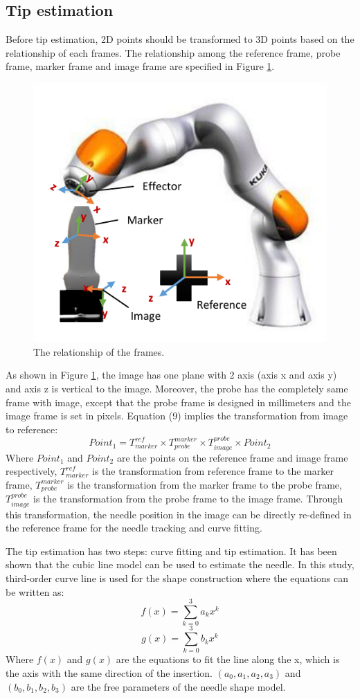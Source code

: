 \documentclass[journal,article,submit,moreauthors,pdftex]{Definitions/mdpi}
\begin{document}
\subsection{Tip estimation}
Before tip estimation, 2D points should be transformed to 3D points based on the relationship of each frames. The relationship among the reference frame, probe frame, marker frame and image frame are specified in Figure \ref{fig:5}.

\begin{figure}[H]
\centering
\includegraphics[width=8.2 cm]{figures/2/f5.pdf}
\captionsetup{width=16 cm,justification=centering}
\caption{The relationship of the frames.}\label{fig:5}
\end{figure}

As shown in Figure \ref{fig:5}, the image has one plane with 2 axis (axis x and axis y) and axis z is vertical to the image. Moreover, the probe has the completely same frame with image, except that the probe frame is designed in millimeters and the image frame is set in pixels. Equation (9) implies the transformation from image to reference:
\begin{equation}
{Point}_1=T_{marker}^{ref}\times T_{probe}^{marker}\times T_{image}^{probe}\times {Point}_2
\end{equation}
Where ${{Point}_1}$ and ${{Point}_2}$ are the points on the reference frame and image frame respectively, ${T_{marker}^{ref}}$ is the transformation from reference frame to the marker frame, ${T_{probe}^{marker}}$ is the transformation from the marker frame to the probe frame, ${T_{image}^{probe}}$ is the transformation from the probe frame to the image frame. Through this transformation, the needle position in the image can be directly re-defined in the reference frame for the needle tracking and curve fitting.

The tip estimation has two steps: curve fitting and tip estimation. It has been shown that the cubic line model can be used to estimate the needle. In this study, third-order curve line is used for the shape construction where the equations can be written as:
\begin{equation}
f(x)=\sum_{k=0}^{3}a_k x^k
\end{equation}
\begin{equation}
g(x)=\sum_{k=0}^{3}b_k x^k
\end{equation}
Where ${f(x)}$ and ${g(x)}$ are the equations to fit the line along the x, which is the axis with the same direction of the insertion. ${(a_0,a_1,a_2,a_3)}$ and ${(b_0,b_1,b_2,b_3)}$ are the free parameters of the needle shape model.
\end{document}
